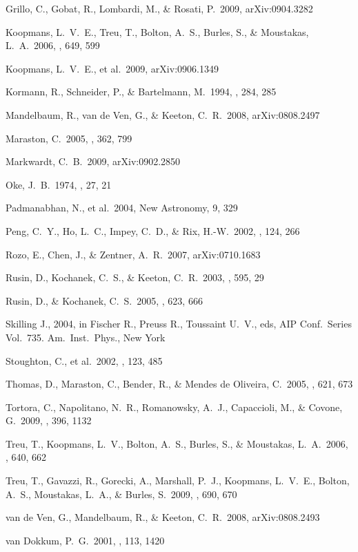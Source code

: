  Grillo, C., Gobat, R., Lombardi, M., \& Rosati, P.\ 2009, arXiv:0904.3282 

 Koopmans, L.~V.~E., Treu, T., Bolton, A.~S., Burles, S., \& Moustakas, L.~A.\ 2006, \apj, 649, 599 

 Koopmans, L.~V.~E., et al.\ 2009, arXiv:0906.1349 

 Kormann, R., Schneider, P., \& Bartelmann, M.\ 1994, \aap, 284, 285 

 Mandelbaum, R., van de Ven, G., \& Keeton, C.~R.\ 2008, arXiv:0808.2497

 Maraston, C.\ 2005, \mnras, 362, 799 

 Markwardt, C.~B.\ 2009, arXiv:0902.2850

 Oke, J.~B.\ 1974, \apjs, 27, 21

 Padmanabhan, N., et 
al.\ 2004, New Astronomy, 9, 329 

 Peng, C.~Y., Ho, L.~C., Impey, C.~D., \& Rix, H.-W.\ 2002, \aj, 124, 266 

 Rozo, E., Chen, J., \& Zentner, A.~R.\ 2007, arXiv:0710.1683 

 Rusin, D., Kochanek, C.~S., \& Keeton, C.~R.\ 2003, \apj, 595, 29 

 Rusin, D., \& Kochanek, C.~S.\ 2005, \apj, 623, 666 

 Skilling J., 2004, in Fischer R., Preuss R., Toussaint U.~V., eds, AIP Conf.~Series Vol.~735. Am.~Inst.~Phys., New York 

 Stoughton, C., et al.\ 2002, \aj, 123, 485 

 Thomas, D., Maraston, C., Bender, R., \& Mendes de Oliveira, C.\ 2005, \apj, 621, 673 

 Tortora, C., Napolitano, N.~R., Romanowsky, A.~J., Capaccioli, M., \& Covone, G.\ 2009, \mnras, 396, 1132 

 Treu, T., Koopmans, L.~V., Bolton, A.~S., Burles, S., \& Moustakas, L.~A.\ 2006, \apj, 640, 662 

 Treu, T., Gavazzi, R., Gorecki, A., Marshall, P.~J., Koopmans, L.~V.~E., Bolton, A.~S., Moustakas, L.~A., \& Burles, S.\ 2009, \apj, 690, 670 

 van de Ven, G., Mandelbaum, R., \& Keeton, C.~R.\ 2008, arXiv:0808.2493

 van Dokkum, P.~G.\ 2001, \pasp, 113, 1420 

